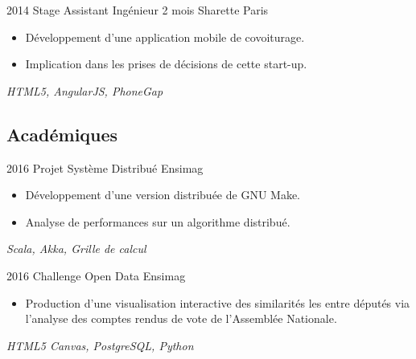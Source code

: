 \documentclass[11pt,a4paper,sans]{moderncv} %
\begin{document}
\cventry
    {2014}
    {Stage Assistant Ingénieur}
    {2 mois}
    {Sharette}
    {Paris}
    {
        \begin{itemize}
            \item Développement d'une application mobile de covoiturage.
        \item Implication dans les prises de décisions de cette start-up.
        \end{itemize}
        \vspace*{1mm}
        \textit{HTML5, AngularJS, PhoneGap}
    }

\subsection{Académiques}

\cventry
    {2016}
    {Projet Système Distribué}
    {}
    {Ensimag}
    {}
    {
        \begin{itemize}
            \item Développement d'une version distribuée de GNU Make.
            \item Analyse de performances sur un algorithme distribué.
        \end{itemize}
        \vspace*{1mm}
        \textit{Scala, Akka, Grille de calcul}
    }


\cventry
    {2016}
    {Challenge Open Data}
    {}
    {Ensimag}
    {}
    {
        \begin{itemize}
            \item Production d'une visualisation interactive des similarités les entre députés via l'analyse des comptes rendus de vote de l'Assemblée Nationale.
        \end{itemize}
        \vspace*{1mm}
        \textit{HTML5 Canvas, PostgreSQL, Python}
    }

\end{document}

